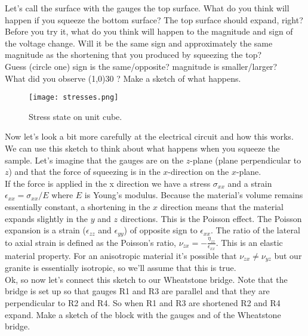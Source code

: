\documentclass[10pt]{article}
\begin{document}
Let’s call the surface with the gauges the top surface.  What do you think will happen if you squeeze the bottom surface? The top surface should expand, right?  Before you try it, what do you think will happen to the magnitude and sign of the voltage change. Will it be the same sign and approximately the same magnitude as the shortening that you produced by squeezing the top? \\

Guess (circle one) sign is the same/opposite? magnitude is smaller/larger?\\

What did you observe \line(1,0){30} ? Make a sketch of what happens. \\

\begin{figure}[ht]
	\centering
	\texttt{[image: stresses.png]}
	\caption{Stress state on unit cube.}
	\label{fig:stresses}
\end{figure}

Now let’s look a bit more carefully at the electrical circuit and how this works. We can use this sketch to think about what happens when you squeeze the sample. Let’s imagine that the gauges are on the $ z $-plane (plane perpendicular to $ z $) and that the force of squeezing is in the $ x $-direction on the $ x $-plane. \\

If the force is applied in the x direction we have a stress $ \sigma_{xx} $ and a strain $ \epsilon_{xx} = \sigma_{xx}/E $ where $ E $ is Young’s modulus. Because the material’s volume remains essentially constant, a shortening in the $ x $ direction means that the material expands slightly in the $ y $ and $ z $ directions. This is the Poisson effect.  The Poisson expansion is a strain ($ \epsilon_{zz} $ and $ \epsilon_{yy} $) of opposite sign to $ \epsilon_{xx} $.  The ratio of the lateral to axial strain is defined as the Poisson’s ratio, $ \nu_{zx} = -\frac{\eta_{zz}}{\epsilon_{xx}}$.  This is an elastic material property.  For an anisotropic material it’s possible that  $ \nu_{zx} \neq \nu_{yz}$ but our granite is essentially isotropic, so we’ll assume that this is true.
\\

Ok, so now let’s connect this sketch to our Wheatstone bridge.  Note that the bridge is set up so that gauges R1 and R3 are parallel and that they are perpendicular to R2 and R4.  So when R1 and R3 are shortened R2 and R4 expand.
Make a sketch of the block with the gauges and of the Wheatstone bridge. \\
\end{document}
